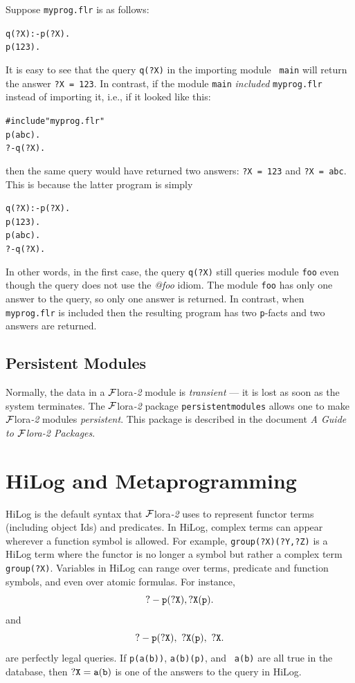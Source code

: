 \documentclass[11pt]{article}
\newcommand{\FLORA}{{\mbox{\sc ${\cal F}${lora}\rm\emph{-2}}}\xspace}
\begin{document}
Suppose {\tt myprog.flr} is as follows:
\begin{alltt}
  q(?X) :- p(?X).
  p(123).
\end{alltt}
It is easy to see that the query {\tt q(?X)} in the importing module {\tt
  main} will return the answer {\tt ?X = 123}. In contrast, if the module
{\tt main} \emph{included} {\tt myprog.flr} instead of importing it, i.e.,
if it looked like this:
\begin{alltt}
  #include "myprog.flr"
  p(abc).
  ?- q(?X).
\end{alltt}
then the same query would have returned two answers: {\tt ?X = 123} and 
{\tt ?X = abc}. This is because the latter program is simply
\begin{alltt}
  q(?X) :- p(?X).
  p(123).
  p(abc).
  ?- q(?X).
\end{alltt}
In other words, in the first case, the query {\tt q(?X)} still queries
module {\tt foo} even though the query does not use the \emph{@foo}    
idiom. The module {\tt foo} has only one answer to the query, so only one
answer is returned. In contrast, when {\tt myprog.flr} is included then
the resulting program has two {\tt p}-facts and two answers are returned. 

\subsection{Persistent Modules}\label{sec-persist-storage}

Normally, the data
in a \FLORA module is
{\em transient} --- it is lost as soon as the system terminates.
The \FLORA package {\tt persistentmodules}  allows one to make
\FLORA modules \emph{persistent}. This package is described in
the document \emph{A Guide to \FLORA Packages}.


\section{HiLog and Metaprogramming} \label{sec:hilog}


%
HiLog \cite{hilog-jlp} is the default syntax that \FLORA uses to
represent functor terms (including object Ids) and predicates.  In
HiLog, complex terms can appear wherever a function symbol is
allowed. For example, {\tt group(?X)(?Y,?Z)} is a HiLog term where the
functor is no longer a symbol but rather a complex term {\tt
group(?X)}. Variables in HiLog can range over terms, predicate and
function symbols, and even over atomic formulas. For instance,
\[
{\tt
 ?- p(?X), ?X(p).
}
\]
\noindent
and
\begin{equation}\label{eq-hilog-notallowed}
{\tt
 ?- p(?X), ~?X(p), ~?X.  
}
\end{equation}
\noindent
are perfectly legal queries. If {\tt p(a(b))}, {\tt a(b)(p)}, and {\tt
a(b)} are all true in the database, then $\tt ?X=a(b)$ is one of the answers
to the query in HiLog.
\end{document}
